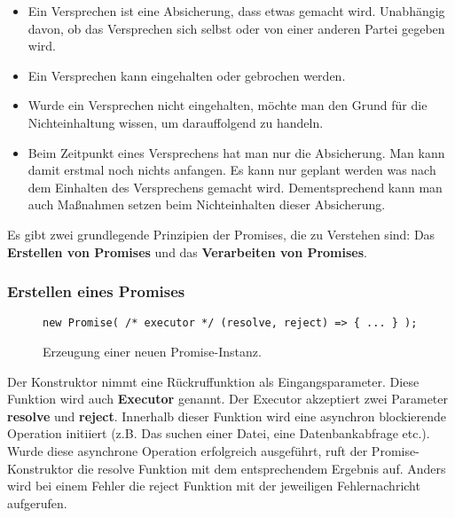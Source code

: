 \begin{itemize}
    \item Ein Versprechen ist eine Absicherung, dass etwas gemacht wird. Unabhängig davon, ob das Versprechen sich selbst oder von einer anderen Partei gegeben wird.
    
    \item Ein Versprechen kann eingehalten oder gebrochen werden.
    
    \item Wurde ein Versprechen nicht eingehalten, möchte man den Grund für die Nichteinhaltung wissen, um darauffolgend zu handeln.
    
    \item Beim Zeitpunkt eines Versprechens hat man nur die Absicherung. Man kann damit erstmal noch nichts anfangen. Es kann nur geplant werden was nach dem Einhalten des Versprechens gemacht wird. Dementsprechend kann man auch Maßnahmen setzen beim Nichteinhalten dieser Absicherung.
    
\end{itemize}

\noindent
Es gibt zwei grundlegende Prinzipien der Promises, die zu Verstehen sind: Das \textbf{Erstellen von Promises} und das \textbf{Verarbeiten von Promises}.

\subsubsection{Erstellen eines Promises}

\begin{figure}[H]
\begin{lstlisting}[basicstyle=\small]
new Promise( /* executor */ (resolve, reject) => { ... } );
\end{lstlisting}
\caption{Erzeugung einer neuen Promise-Instanz.}
\end{figure}

Der Konstruktor nimmt eine Rückruffunktion als Eingangsparameter. Diese Funktion wird auch \textbf{Executor} genannt\cite{promise-executor}. Der Executor akzeptiert zwei Parameter \textbf{resolve} und \textbf{reject}. Innerhalb dieser Funktion wird eine asynchron blockierende Operation initiiert (z.B. Das suchen einer Datei, eine Datenbankabfrage etc.). Wurde diese asynchrone Operation erfolgreich ausgeführt, ruft der Promise-Konstruktor die resolve Funktion mit dem entsprechendem Ergebnis auf. Anders wird bei einem Fehler die reject Funktion mit der jeweiligen Fehlernachricht aufgerufen.

